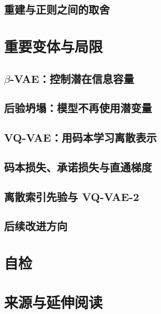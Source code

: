 \subsection{重建与正则之间的取舍}
\label{subsec:vae-balance}
\contentplaceholder

\section{重要变体与局限}
\label{sec:vae-variants}
\contentplaceholder

\subsection{\texorpdfstring{$\beta$}{beta}-VAE：控制潜在信息容量}
\label{subsec:vae-beta-vae}
\contentplaceholder

\subsection{后验坍塌：模型不再使用潜变量}
\label{subsec:vae-collapse}
\contentplaceholder

\subsection{VQ-VAE：用码本学习离散表示}
\label{subsec:vae-vq-vae}
\contentplaceholder

\subsection{码本损失、承诺损失与直通梯度}
\label{subsec:vae-vq-optimization}
\contentplaceholder

\subsection{离散索引先验与 VQ-VAE-2}
\label{subsec:vae-discrete-prior}
\contentplaceholder

\subsection{后续改进方向}
\label{subsec:vae-future}
\contentplaceholder

\section{自检}
\label{sec:vae-review}
\contentplaceholder

\section{来源与延伸阅读}
\label{sec:vae-reading}
\contentplaceholder
